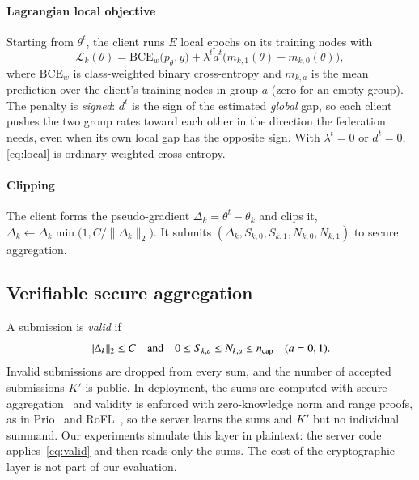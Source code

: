 \paragraph{Lagrangian local objective}
Starting from $\theta^t$, the client runs $E$ local epochs on its training nodes with
\begin{equation}\label{eq:local}
\mathcal{L}_k(\theta)=\mathrm{BCE}_w\bigl(p_\theta,y\bigr)+\lambda^t d^t\bigl(m_{k,1}(\theta)-m_{k,0}(\theta)\bigr),
\end{equation}
where $\mathrm{BCE}_w$ is class-weighted binary cross-entropy and $m_{k,a}$ is the mean prediction over the client's training nodes in group $a$ (zero for an empty group). The penalty is \emph{signed}: $d^t$ is the sign of the estimated \emph{global} gap, so each client pushes the two group rates toward each other in the direction the federation needs, even when its own local gap has the opposite sign. With $\lambda^t=0$ or $d^t=0$, \eqref{eq:local} is ordinary weighted cross-entropy.

\paragraph{Clipping}
The client forms the pseudo-gradient $\Delta_k=\theta^t-\theta_k$ and clips it, $\Delta_k\leftarrow\Delta_k\min\bigl(1,C/\|\Delta_k\|_2\bigr)$. It submits $(\Delta_k,S_{k,0},S_{k,1},N_{k,0},N_{k,1})$ to secure aggregation.

\subsection{Verifiable secure aggregation}
A submission is \emph{valid} if
\begin{equation}\label{eq:valid}
\|\Delta_k\|_2\le C\quad\text{and}\quad 0\le S_{k,a}\le N_{k,a}\le n_{\mathrm{cap}}\quad(a=0,1).
\end{equation}
Invalid submissions are dropped from every sum, and the number of accepted submissions $K'$ is public. In deployment, the sums are computed with secure aggregation~\citep{bonawitz2017practical} and validity is enforced with zero-knowledge norm and range proofs, as in Prio~\citep{corrigangibbs2017prio} and RoFL~\citep{lycklama2023rofl}, so the server learns the sums and $K'$ but no individual summand. Our experiments simulate this layer in plaintext: the server code applies~\eqref{eq:valid} and then reads only the sums. The cost of the cryptographic layer is not part of our evaluation.

